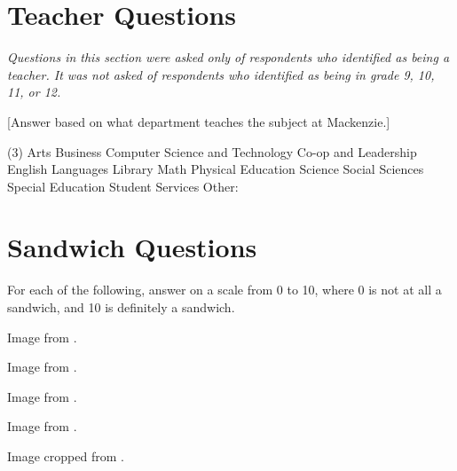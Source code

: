 \clearpage
\section{Teacher Questions}
	\textit{Questions in this section were asked only of respondents who identified as being a teacher.
	It was not asked of respondents who identified as being in grade 9, 10, 11, or 12.}

	\begin{minipage}{\textwidth}
		[Answer based on what department teaches the subject at Mackenzie.]
		\begin{multiplechoice}(3)
			\choice Arts
			\choice Business
			\choice Computer Science and Technology
			\choice Co-op and Leadership
			\choice English
			\choice Languages
			\choice Library
			\choice Math
			\choice Physical Education
			\choice Science
			\choice Social Sciences
			\choice Special Education
			\choice Student Services
			\choice Other: \blank
		\end{multiplechoice}
	\end{minipage}

\clearpage
\section{Sandwich Questions}
	For each of the following, answer on a scale from 0 to 10, where 0 is not at all a sandwich, and 10 is definitely a sandwich.

	\begin{minipage}{\textwidth}
		Image from \cite{hamSandwich}.
	\end{minipage}

	\begin{minipage}{\textwidth}
		Image from \cite{bltSandwich}.
	\end{minipage}

	\begin{minipage}{\textwidth}
		Image from \cite{grilledCheese}.
	\end{minipage}

	\begin{minipage}{\textwidth}
		Image from \cite{panini}.
	\end{minipage}

	\begin{minipage}{\textwidth}
		Image cropped from \cite{subSandwich}.
	\end{minipage}

